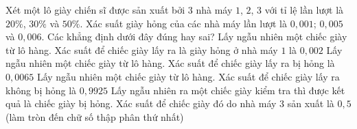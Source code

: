 \begin{ex}%
Xét một lô giày chiến sĩ được sản xuất bởi $3$ nhà máy $1$, $2$, $3$ với tỉ lệ lần lượt là $20\%$, $30\%$ và $50\%$. Xác suất giày hỏng của các nhà máy lần lượt là $0{,}001$; $0{,}005$ và $0{,}006$. Các khẳng định dưới đây đúng hay sai?
\choiceTF
	{\True Lấy ngẫu nhiên một chiếc giày từ lô hàng. Xác suất để chiếc giày lấy ra là giày hỏng ở nhà máy $1$ là $0{,}002$ }
	{\True Lấy ngẫu nhiên một chiếc giày từ lô hàng. Xác suất để chiếc giày lấy ra bị hỏng là $0{,}0065$}
	{Lấy ngẫu nhiên một chiếc giày từ lô hàng. Xác suất để chiếc giày lấy ra không bị hỏng là $0{,}9925$}
	{Lấy ngẫu nhiên ra một chiếc giày kiểm tra thì được kết quả là chiếc giày bị hỏng. Xác suất để chiếc giày đó do nhà máy $3$ sản xuất là $0{,}5$ (làm tròn đến chữ số thập phân thứ nhất)}
\end{ex}

